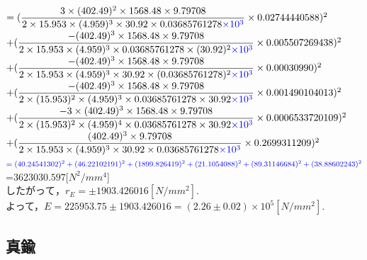 \documentclass[a4paper,1pt]{jsarticle}
\newcommand{\blue}[1]{\textcolor{blue}{#1}}
\begin{document}
$=(\dfrac{3\times(402.49)^2\times1568.48\times9.79708}{2\times15.953\times(4.959)^3\times30.92\times0.03685761278\blue{\times10^3}}\times0.02744440588)^2$\\

$+(\dfrac{-(402.49)^3\times1568.48\times9.79708}{2\times15.953\times(4.959)^3\times0.03685761278\times(30.92)^2\blue{\times10^3}}\times0.005507269438)^2$\\

$+(\dfrac{-(402.49)^3\times1568.48\times9.79708}{2\times15.953\times(4.959)^3\times30.92\times(0.03685761278)^2\blue{\times10^3}}\times0.00030990)^2$\\

$+(\dfrac{-(402.49)^3\times1568.48\times9.79708}{2\times(15.953)^2\times(4.959)^3\times0.03685761278\times30.92\blue{\times10^3}}\times0.001490104013)^2$\\

$+(\dfrac{-3\times(402.49)^3\times1568.48\times9.79708}{2\times(15.953)^2\times(4.959)^4\times0.03685761278\times30.92\blue{\times10^3}}\times0.0006533720109)^2$\\

$+(\dfrac{(402.49)^3\times9.79708}{2\times15.953\times(4.959)^3\times30.92\times0.03685761278\blue{\times10^3}}\times0.2699311209)^2$\\

$\blue{=(40.24541302)^2+(46.22102191)^2+(1899.826419)^2+(21.1054088)^2+(89.31146684)^2+(38.88602243)^2}$\\



=$3623030.597[N^2/mm^4$]\\

$したがって，r_E=\pm1903.426016[N/mm^2].$\\

よって，$E=225953.75\pm1903.426016=(2.26\pm0.02)\times10^5[N/mm^2].$





\clearpage

\subsection*{真鍮}
\end{document}
